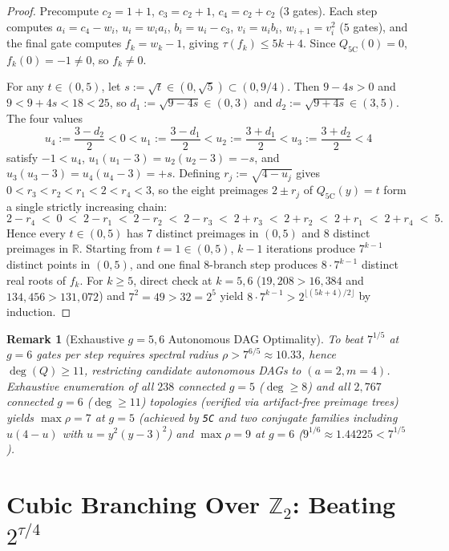 \documentclass[11pt]{article}
\newtheorem{remark}[theorem]{Remark}
\newcommand{\Z}{\mathbb{Z}}
\newcommand{\R}{\mathbb{R}}
\newcommand{\code}[1]{\texttt{#1}}
\begin{document}
\begin{proof}
Precompute $c_2 = 1+1$, $c_3 = c_2 + 1$, $c_4 = c_2 + c_2$ ($3$ gates). Each step computes $a_i = c_4 - w_i$, $u_i = w_i a_i$, $b_i = u_i - c_3$, $v_i = u_i b_i$, $w_{i+1} = v_i^2$ ($5$ gates), and the final gate computes $f_k = w_k - 1$, giving $\tau(f_k) \le 5k + 4$. Since $Q_{\mathrm{5C}}(0) = 0$, $f_k(0) = -1 \neq 0$, so $f_k \neq 0$.

For any $t \in (0, 5)$, let $s := \sqrt{t} \in (0, \sqrt{5}) \subset (0, 9/4)$. Then $9 - 4s > 0$ and $9 < 9 + 4s < 18 < 25$, so $d_1 := \sqrt{9 - 4s} \in (0, 3)$ and $d_2 := \sqrt{9 + 4s} \in (3, 5)$. The four values
\[
  u_4 := \frac{3 - d_2}{2} < 0 < u_1 := \frac{3 - d_1}{2} < u_2 := \frac{3 + d_1}{2} < u_3 := \frac{3 + d_2}{2} < 4
\]
satisfy $-1 < u_4$, $u_1(u_1 - 3) = u_2(u_2 - 3) = -s$, and $u_3(u_3 - 3) = u_4(u_4 - 3) = +s$. Defining $r_j := \sqrt{4 - u_j}$ gives $0 < r_3 < r_2 < r_1 < 2 < r_4 < 3$, so the eight preimages $2 \pm r_j$ of $Q_{\mathrm{5C}}(y) = t$ form a single strictly increasing chain:
\[
  2 - r_4 \;<\; 0 \;<\; 2 - r_1 \;<\; 2 - r_2 \;<\; 2 - r_3 \;<\; 2 + r_3 \;<\; 2 + r_2 \;<\; 2 + r_1 \;<\; 2 + r_4 \;<\; 5.
\]
Hence every $t \in (0, 5)$ has $7$ distinct preimages in $(0, 5)$ and $8$ distinct preimages in $\R$. Starting from $t = 1 \in (0, 5)$, $k - 1$ iterations produce $7^{k-1}$ distinct points in $(0, 5)$, and one final $8$-branch step produces $8 \cdot 7^{k-1}$ distinct real roots of $f_k$. For $k \ge 5$, direct check at $k = 5, 6$ ($19{,}208 > 16{,}384$ and $134{,}456 > 131{,}072$) and $7^2 = 49 > 32 = 2^5$ yield $8 \cdot 7^{k-1} > 2^{\lfloor(5k+4)/2\rfloor}$ by induction.
\end{proof}

\begin{remark}[Exhaustive $g = 5, 6$ Autonomous DAG Optimality]
To beat $7^{1/5}$ at $g = 6$ gates per step requires spectral radius $\rho > 7^{6/5} \approx 10.33$, hence $\deg(Q) \ge 11$, restricting candidate autonomous DAGs to $(a = 2, m = 4)$. Exhaustive enumeration of all $238$ connected $g = 5$ ($\deg \ge 8$) and all $2{,}767$ connected $g = 6$ ($\deg \ge 11$) topologies (verified via artifact-free preimage trees) yields $\max \rho = 7$ at $g = 5$ (achieved by \code{5C} and two conjugate families including $u(4-u)$ with $u = y^2(y-3)^2$) and $\max \rho = 9$ at $g = 6$ ($9^{1/6} \approx 1.44225 < 7^{1/5}$).
\end{remark}

\section{Cubic Branching Over $\Z_2$: Beating $2^{\tau/4}$}
\end{document}
